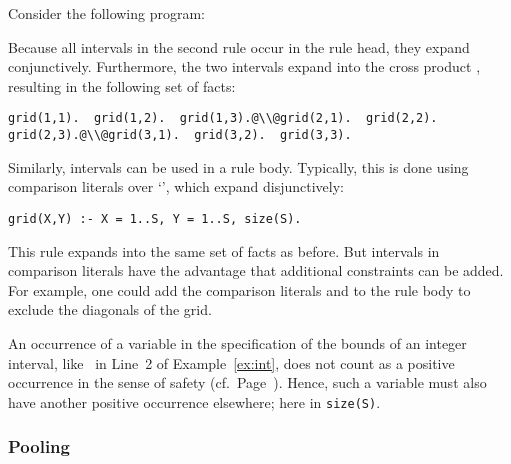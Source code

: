 \begin{example}\label{ex:int}
Consider the following program:

Because all intervals in the second rule occur in the rule head,
they expand conjunctively.
Furthermore, the two intervals expand into the cross product ,
resulting in the following set of facts:
\begin{lstlisting}[escapechar=@,firstnumber=2]
grid(1,1).  grid(1,2).  grid(1,3).@\\@grid(2,1).  grid(2,2).  grid(2,3).@\\@grid(3,1).  grid(3,2).  grid(3,3).
\end{lstlisting}
Similarly, intervals can be used in a rule body.
Typically, this is done using comparison literals over `\code{=}', which expand disjunctively:
\begin{lstlisting}[firstnumber=2]
grid(X,Y) :- X = 1..S, Y = 1..S, size(S).
\end{lstlisting}
This rule expands into the same set of facts as before.
But intervals in comparison literals have the advantage that additional constraints can be added.
For example, one could add the comparison literals  and 
to the rule body to exclude the diagonals of the grid.
\end{example}

\begin{note}
An occurrence of a variable in the specification of the bounds
of an integer interval, like~ in Line~2 of Example~\ref{ex:int},
does not count as a positive occurrence
in the sense of safety (cf.\ Page~\pageref{pg:safe}).
Hence, such a variable must also have another positive occurrence elsewhere;
here in \lstinline{size(S)}.
%
\end{note}

\subsubsection{Pooling}\label{subsec:gringo:pool}

